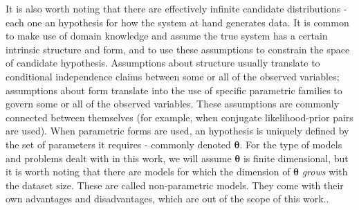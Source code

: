 It is also worth noting that there are effectively infinite candidate distributions -
each one an hypothesis for how the system at hand generates data. It is common
to make use of domain knowledge and assume the true system has a certain intrinsic
structure and form, and to use these assumptions to constrain the space of
candidate hypothesis. Assumptions about structure usually translate to conditional
independence claims between some or all of the observed variables; assumptions
about form translate into the use of specific parametric families to govern some
or all of the observed variables. These assumptions are commonly connected between
themselves (for example, when conjugate likelihood-prior pairs are used). When parametric
forms are used, an hypothesis is uniquely defined by the set of parameters it
requires - commonly denoted $\bm{\theta}$. For the type of models and problems
dealt with in this work, we will assume $\bm{\theta}$ is finite dimensional, but it is worth
noting that there are models for which the dimension of $\bm{\theta}$ \emph{grows}
with the dataset size. These are called non-parametric models. They come with
their own advantages and disadvantages, which are out of the scope of this work..

